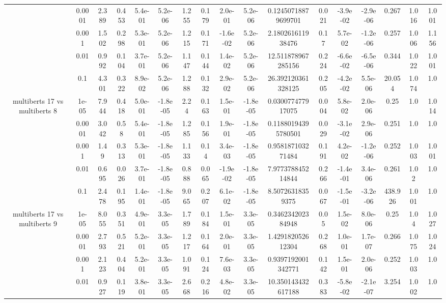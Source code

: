 \begin{tabular}{|c|c|c|c|c|c|c|c|c|c|c|c|c|c|c|c|c|}
 & 0.0001 & 2.389 & 0.453 & 5.4e-01 & 5.2e-06 & 1.255 & 0.179 & 2.0e-01 & 5.2e-06 & 0.12450718879699701 & 0.021 & -3.9e-02 & -2.9e-06 & 0.267 & 1.016 & 1.001 \\
 & 0.001 & 1.502 & 0.298 & 5.3e-01 & 5.2e-06 & 1.215 & 0.171 & -1.6e-02 & 5.2e-06 & 2.180261611938476 & 0.17 & 5.7e-02 & -1.2e-06 & 0.257 & 1.006 & 1.156 \\
 & 0.01 & 0.992 & 0.104 & 3.7e-01 & 5.2e-06 & 1.147 & 0.144 & 1.4e-02 & 5.2e-06 & 12.511878967285156 & 0.224 & -6.6e-02 & -6.5e-06 & 0.344 & 1.022 & 1.001 \\
 & 0.1 & 4.301 & 0.322 & 8.9e-02 & 5.2e-06 & 1.288 & 0.132 & 2.9e-02 & 5.2e-06 & 26.392120361328125 & 0.205 & -4.2e-02 & 5.5e-06 & 20.054 & 1.074 & 1.0 \\
\hline
\multirow{5}{*}{multiberts 17 vs multiberts 8} & 1e-05 & 7.944 & 0.418 & 5.0e-01 & -1.8e-05 & 2.24 & 0.163 & 1.5e-01 & -1.8e-05 & 0.030077477917075 & 0.004 & 5.8e-02 & 2.0e-06 & 0.25 & 1.0 & 1.014 \\
 & 0.0001 & 3.042 & 0.58 & 5.4e-01 & -1.8e-05 & 1.285 & 0.156 & 1.9e-01 & -1.8e-05 & 0.11880194395780501 & 0.029 & -3.1e-02 & 2.9e-06 & 0.251 & 1.0 & 1.0 \\
 & 0.001 & 1.49 & 0.313 & 5.3e-01 & -1.8e-05 & 1.133 & 0.14 & 3.4e-03 & -1.8e-05 & 0.958187103271484 & 0.191 & 4.2e-02 & -1.2e-06 & 0.252 & 1.003 & 1.001 \\
 & 0.01 & 0.695 & 0.026 & 3.7e-01 & -1.8e-05 & 0.888 & 0.065 & -1.9e-02 & -1.8e-05 & 7.977378845214844 & 0.266 & -1.4e-01 & 3.4e-06 & 0.261 & 1.02 & 1.0 \\
 & 0.1 & 2.478 & 0.195 & 1.4e-01 & -1.8e-05 & 9.065 & 0.207 & 6.1e-02 & -1.8e-05 & 8.50726318359375 & 0.067 & -1.5e-01 & -3.2e-06 & 438.926 & 1.001 & 1.0 \\
\hline
\multirow{5}{*}{multiberts 17 vs multiberts 9} & 1e-05 & 8.055 & 0.351 & 4.9e-01 & 3.3e-05 & 1.789 & 0.184 & 1.5e-01 & 3.3e-05 & 0.346234202384948 & 0.05 & 1.5e-02 & 8.0e-06 & 0.25 & 1.04 & 1.027 \\
 & 0.0001 & 2.793 & 0.521 & 5.2e-01 & 3.3e-05 & 1.217 & 0.164 & 2.0e-01 & 3.3e-05 & 1.429182052612304 & 0.268 & 1.0e-01 & 1.7e-07 & 0.266 & 1.075 & 1.024 \\
 & 0.001 & 2.123 & 0.404 & 5.2e-01 & 3.3e-05 & 1.091 & 0.124 & 7.6e-03 & 3.3e-05 & 0.9397192001342771 & 0.142 & 1.5e-01 & 2.0e-06 & 0.252 & 1.003 & 1.0 \\
 & 0.01 & 0.927 & 0.119 & 3.8e-01 & 3.3e-05 & 2.668 & 0.216 & 4.8e-02 & 3.3e-05 & 10.350143432617188 & 0.383 & -5.8e-02 & -2.1e-07 & 3.254 & 1.002 & 1.0 \\

\end{tabular}
